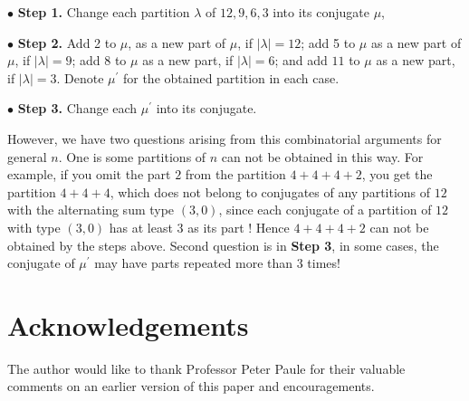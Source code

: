 \documentclass[draft]{amsart}
\numberwithin{equation}{section}
\theoremstyle{plain}
\theoremstyle{remark}
\begin{document}
$\bullet$ \textbf{Step 1.} Change each partition $\lambda$ of $12, 9,6,3$ into its conjugate $\mu$,

$\bullet$ \textbf{Step 2.}  Add 2 to $\mu$, as a new part of $\mu$, if $|\lambda|=12$;  add 5 to $\mu$ as a new part of $\mu$, if $|\lambda|=9$; add 8 to $\mu$ as a new part, if $|\lambda|=6$; and add $11$ to $\mu$ as a new part, if $|\lambda|=3$.  Denote $\mu^{\prime}$ for the obtained partition in each case.


$\bullet$ \textbf{Step 3.} Change each $\mu^{\prime}$ into its conjugate.

However,  we have two questions arising from this combinatorial arguments for general $n$.  One is some partitions of $n$ can not be obtained in this way.  For example,  if you omit the part $2$ from the partition $4+4+4+2$,  you get the partition $4+4+4$, which does not belong to  conjugates of any partitions of $12$ with the alternating sum type $(3,0)$, since  each conjugate of a partition of $12$ with type $(3, 0 )$ has at least $3$ as its part !  Hence $4+4+4+2$ can not be obtained by the steps above.
Second question is in \textbf{Step 3}, in some cases,  the conjugate of $\mu^{\prime}$ may have parts repeated more than 3 times! 





\section*{Acknowledgements}
The author would like to thank Professor Peter Paule  for their valuable comments on an earlier version of this paper and encouragements. 
\end{document}
